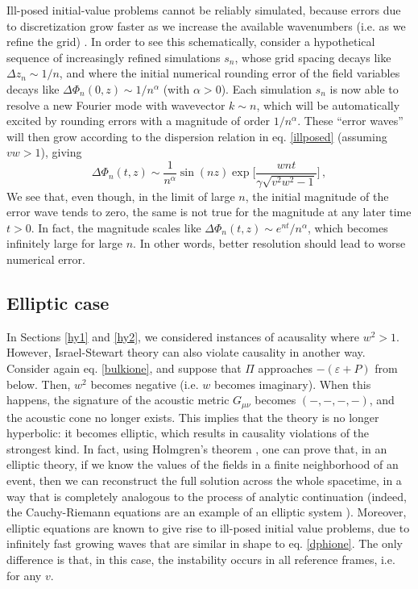 \documentclass[aps, prd, showkeys,superscriptaddress, nofootinbib,floatfix]{revtex4-2}
\begin{document}
Ill-posed initial-value problems cannot be reliably simulated, because errors due to discretization grow faster as we increase the available wavenumbers (i.e. as we refine the grid)   \cite{Babichev:2007dw,Gavassino:2022nff}. In order to see this schematically, consider a hypothetical sequence of increasingly refined simulations $s_n$, whose grid spacing decays like $\Delta z_n\sim 1/n$, and where the initial numerical rounding error of the field variables decays like $\Delta \Phi_{n}(0,z) \sim 1/n^\alpha$ (with $\alpha >0$). Each simulation $s_n$ is now able to resolve a new Fourier mode with wavevector $k\sim n$, which will be automatically excited by rounding errors with a magnitude of order $1/n^\alpha$. These ``error waves'' will then grow according to the dispersion relation in eq. \eqref{illposed} (assuming $vw>1$), giving
\begin{equation}\label{dphione}
\Delta \Phi_n(t,z) \sim \dfrac{1}{n^\alpha} \sin(nz) \exp\bigg[\dfrac{w nt}{\gamma \sqrt{v^2 w^2-1}} \bigg] \, ,
\end{equation}
We see that, even though, in the limit of large $n$, the initial magnitude of the error wave tends to zero, the same is not true for the magnitude at any later time $t>0$. In fact, the magnitude scales like $\Delta \Phi_n(t,z)\sim e^{nt}/n^\alpha$, which becomes infinitely large for large $n$. In other words, better resolution should lead to worse numerical error.


\subsection{Elliptic case}\label{elliptiamo}

In Sections \ref{hy1} and \ref{hy2}, we considered instances of acausality where $w^2>1$. However, Israel-Stewart theory can also violate causality in another way. Consider again eq. \eqref{bulkione}, and suppose that $\Pi$ approaches $-(\varepsilon+P)$ from below. Then, $w^2$ becomes negative (i.e. $w$ becomes imaginary). When this happens, the signature of the acoustic metric $G_{\mu \nu}$ becomes $(-,-,-,-)$, and the acoustic cone no longer exists. This implies that the theory is no longer hyperbolic: it becomes elliptic, which results in causality violations of the strongest kind. In fact, using Holmgren's theorem \cite[\S 1.8]{Rauch_book}, one can prove that, in an elliptic theory, if we know the values of the fields in a finite neighborhood of an event, then we can reconstruct the full solution across the whole spacetime, in a way that is completely analogous to the process of analytic continuation (indeed, the Cauchy-Riemann equations are an example of an elliptic system \cite[\S 1.1]{Rauch_book}). Moreover, elliptic equations are known to give rise to ill-posed initial value problems, due to infinitely fast growing waves that are similar in shape to eq. \eqref{dphione}. The only difference is that, in this case, the instability occurs in all reference frames, i.e. for any $v$.
\end{document}
